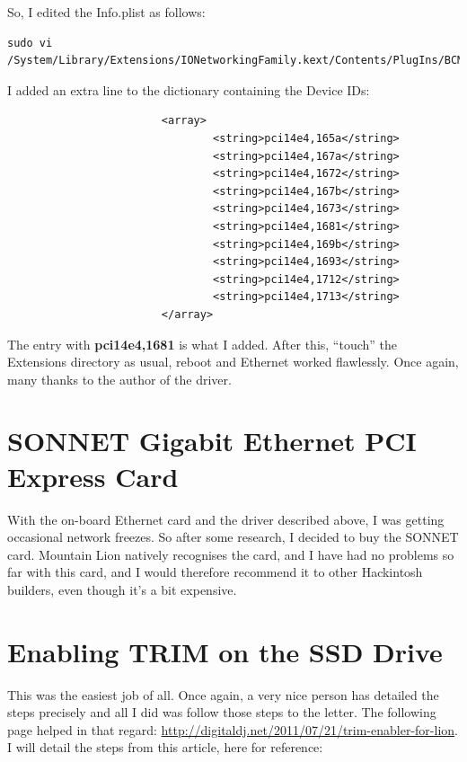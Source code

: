 \documentclass[11pt]{article}
\begin{document}
So, I edited the Info.plist as follows:
\begin{verbatim}
sudo vi /System/Library/Extensions/IONetworkingFamily.kext/Contents/PlugIns/BCM5722D.kext/Contents/Info.plist
\end{verbatim}
I added an extra line to the dictionary containing the Device IDs:
\begin{verbatim}
                        <array>
                                <string>pci14e4,165a</string>
                                <string>pci14e4,167a</string>
                                <string>pci14e4,1672</string>
                                <string>pci14e4,167b</string>
                                <string>pci14e4,1673</string>
                                <string>pci14e4,1681</string>
                                <string>pci14e4,169b</string>
                                <string>pci14e4,1693</string>
                                <string>pci14e4,1712</string>
                                <string>pci14e4,1713</string>
                        </array>
\end{verbatim}
The entry with {\bf pci14e4,1681} is what I added.  After this, ``touch'' the Extensions directory as usual, reboot and Ethernet worked flawlessly.  Once again, many thanks to the author of the driver.

\section{SONNET Gigabit Ethernet PCI Express Card}
With the on-board Ethernet card and the driver described above, I was
getting occasional network freezes.  So after some research, I decided
to buy the SONNET card.  Mountain Lion natively recognises the card,
and I have had no problems so far with this card, and I would
therefore recommend it to other Hackintosh builders, even though it's
a bit expensive.


\section{Enabling TRIM on the SSD Drive}

This was the easiest job of all.  Once again, a very nice person has detailed the steps precisely and all I did was follow those steps to the letter.  The following page helped in that regard: \url{http://digitaldj.net/2011/07/21/trim-enabler-for-lion}.  I will detail the steps from this article, here for reference:
\end{document}
